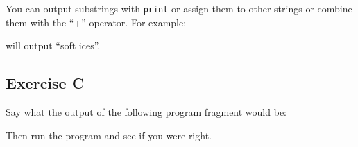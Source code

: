 You can output substrings with \verb!print! or assign them to other
strings or combine them with the ``+'' operator.  For example:


will output ``soft ices''.

\subsection*{Exercise C}

Say what the output of the following program fragment would be:


Then run the program and see if you were right. 




